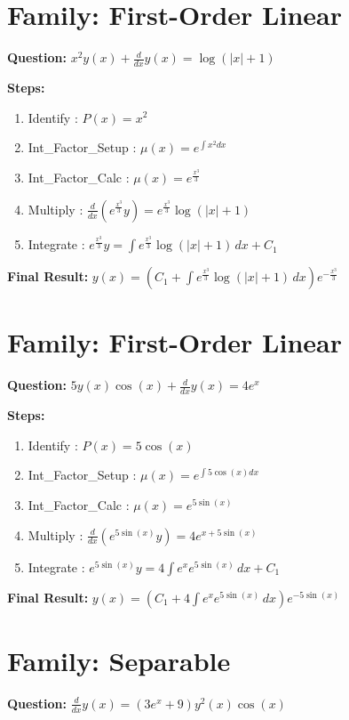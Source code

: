 \documentclass{article}
\begin{document}
\section*{Family: First-Order Linear}
\textbf{Question:} $x^{2} y{\left(x \right)} + \frac{d}{d x} y{\left(x \right)} = \log{\left(\left|{x}\right| + 1 \right)}$

\textbf{Steps:}
\begin{enumerate}
\item Identify :  $P(x) = x^{2}$
\item Int_Factor_Setup :  $\mu(x) = e^{\int x^{2} dx}$
\item Int_Factor_Calc :  $\mu(x) = e^{\frac{x^{3}}{3}}$
\item Multiply :  $\frac{d}{dx}(e^{\frac{x^{3}}{3}}y) = e^{\frac{x^{3}}{3}} \log{\left(\left|{x}\right| + 1 \right)}$
\item Integrate :  $e^{\frac{x^{3}}{3}}y = \int e^{\frac{x^{3}}{3}} \log{\left(\left|{x}\right| + 1 \right)}\, dx + C_1$
\end{enumerate}
\textbf{Final Result:} $y{\left(x \right)} = \left(C_{1} + \int e^{\frac{x^{3}}{3}} \log{\left(\left|{x}\right| + 1 \right)}\, dx\right) e^{- \frac{x^{3}}{3}}$

\section*{Family: First-Order Linear}
\textbf{Question:} $5 y{\left(x \right)} \cos{\left(x \right)} + \frac{d}{d x} y{\left(x \right)} = 4 e^{x}$

\textbf{Steps:}
\begin{enumerate}
\item Identify :  $P(x) = 5 \cos{\left(x \right)}$
\item Int_Factor_Setup :  $\mu(x) = e^{\int 5 \cos{\left(x \right)} dx}$
\item Int_Factor_Calc :  $\mu(x) = e^{5 \sin{\left(x \right)}}$
\item Multiply :  $\frac{d}{dx}(e^{5 \sin{\left(x \right)}}y) = 4 e^{x + 5 \sin{\left(x \right)}}$
\item Integrate :  $e^{5 \sin{\left(x \right)}}y = 4 \int e^{x} e^{5 \sin{\left(x \right)}}\, dx + C_1$
\end{enumerate}
\textbf{Final Result:} $y{\left(x \right)} = \left(C_{1} + 4 \int e^{x} e^{5 \sin{\left(x \right)}}\, dx\right) e^{- 5 \sin{\left(x \right)}}$

\section*{Family: Separable}
\textbf{Question:} $\frac{d}{d x} y{\left(x \right)} = \left(3 e^{x} + 9\right) y^{2}{\left(x \right)} \cos{\left(x \right)}$
\end{document}
